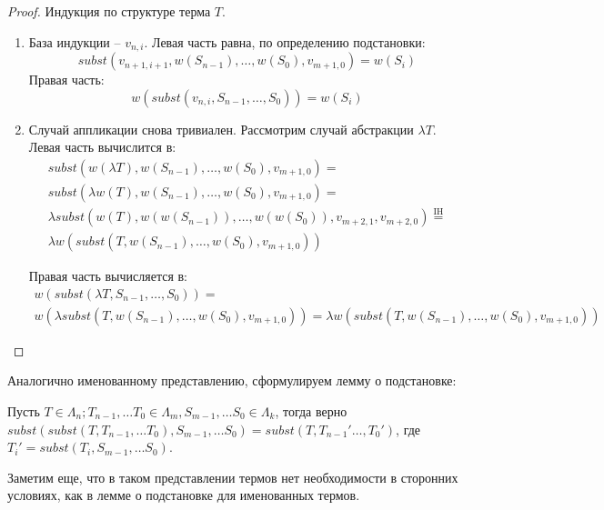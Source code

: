 \begin{proof}
  Индукция по структуре терма $T$.
  \begin{enumerate}
    \item База индукции -- $v_{n, i}$. Левая часть равна, по определению подстановки:
    $$ subst(v_{n+1, i+1}, w(S_{n-1}), \dots, w(S_{0}), v_{m+1, 0}) = w(S_{i})$$
    Правая часть:
    $$w(subst(v_{n,i}, S_{n-1}, \dots, S_{0})) = w(S_{i})$$

    \item Случай аппликации снова тривиален. Рассмотрим случай абстракции $\lambda T$. Левая часть вычислится в:
    \begin{gather*}
        subst(w(\lambda T), w(S_{n-1}), \dots, w(S_{0}), v_{m+1, 0}) = \\
        subst(\lambda w(T), w(S_{n-1}), \dots, w(S_{0}), v_{m+1, 0}) = \\
        \lambda subst(w(T), w(w(S_{n-1})), \dots, w(w(S_{0})), v_{m+2, 1}, v_{m+2,0}) \overset{\mathrm{IH}}{=} \\
        \lambda w(subst(T, w(S_{n-1}), \dots, w(S_{0}), v_{m+1, 0}))
    \end{gather*}

    Правая часть вычисляется в:
    \begin{gather*}
        w(subst(\lambda T, S_{n-1}, \dots, S_{0})) = \\
        w(\lambda subst(T, w(S_{n-1}), \dots, w(S_{0}), v_{m+1, 0})) =
        \lambda w(subst(T, w(S_{n-1}), \dots, w(S_{0}), v_{m+1, 0}))
    \end{gather*}
  \end{enumerate}
\end{proof}

Аналогично именованному представлению, сформулируем лемму о подстановке:

\begin{prop}
  \label{index:assoc}
  Пусть $T \in \Lambda_{n}; T_{n - 1}, \dots T_{0} \in \Lambda_{m}, S_{m-1}, \dots S_{0} \in \Lambda_{k}$, тогда верно $subst(subst(T, T_{n - 1}, \dots T_{0}), S_{m-1}, \dots S_{0}) = subst(T, T_{n - 1}' \dots, T_{0}')$, где $T_{i}' = subst(T_{i}, S_{m-1}, \dots S_{0})$.
\end{prop}

Заметим еще, что в таком представлении термов нет необходимости в сторонних условиях, как в лемме о подстановке для именованных термов.

